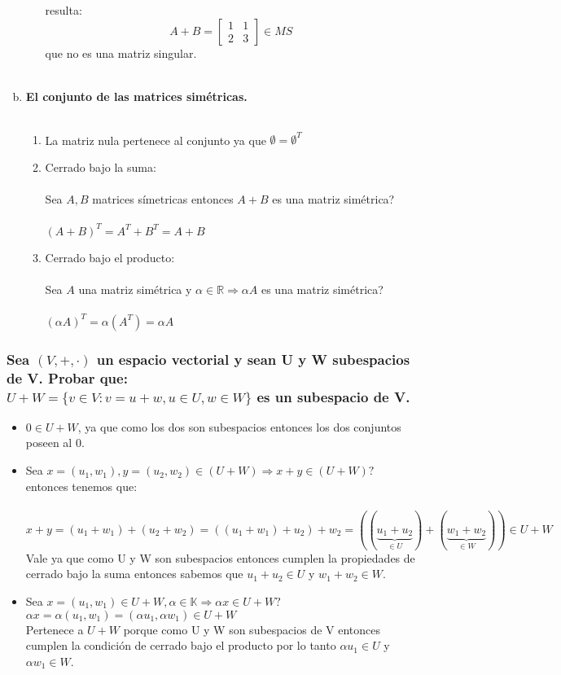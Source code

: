 \documentclass{article}
\begin{document}
\begin{enumerate}[a.]
\begin{enumerate}[(1)]
	resulta:
	\[
	A+B =
	\begin{bmatrix}
	1 & 1 \\
	2 & 3
	\end{bmatrix} \in MS
	\]
	que no es una matriz singular. \\ \\
\end{enumerate}

\item \textbf{El conjunto de las matrices simétricas. } \\ \\
\begin{enumerate}[(1)]
\item
	La matriz nula pertenece al conjunto ya que $\emptyset = \emptyset^T$
\item
	Cerrado bajo la suma: \\ \\
	Sea $A,B$ matrices símetricas entonces $A+B$ es una matriz simétrica? \\ \\
	$(A+B)^T = A^T + B^T = A + B$
\item
	Cerrado bajo el producto: \\ \\
	Sea $A$ una matriz simétrica y $\alpha \in \mathbb{R} \Rightarrow \alpha A$ es una matriz simétrica? \\ \\
	$(\alpha A)^T = \alpha (A^T) = \alpha A$  
\end{enumerate}
\end{enumerate}

\subsubsection{Sea $(V,+,\cdot)$ un espacio vectorial y sean U y W subespacios de V. Probar que: \\
$U+W = \lbrace v \in V : v = u+w, u \in U, w \in W \rbrace$ es un subespacio de V.}

\begin{itemize}
	\item
		$0 \in U+W$, ya que como los dos son subespacios entonces los dos conjuntos poseen al 0.
	\item
		Sea $x = {(u_1,w_1)},y = (u_2,w_2) \in (U+W) \Rightarrow x+y \in (U+W)?$ entonces tenemos que: \\ \\
		$x+y = (u_1+w_1) + (u_2+w_2) = ((u_1+w_1)+u_2)+w_2 = ((\underbrace{u_1+u_2}_{\in U})+(\underbrace{w_1+w_2}_{\in W})) \in U+W$\\
		Vale ya que como U y W son subespacios entonces cumplen la propiedades de cerrado bajo la suma entonces sabemos que $u_1+u_2 \in U$ y
		$w_1 + w_2 \in W$.
	\item
		Sea $x=(u_1,w_1) \in U+W, \alpha \in \mathbb{K} \Rightarrow \alpha x \in U+W?$ \\
		$\alpha x = \alpha (u_1,w_1) = (\alpha u_1,\alpha w_1) \in U+W$\\
		Pertenece a $U+W$ porque como U y W son subespacios de V entonces cumplen la condición de cerrado bajo el producto por lo tanto $\alpha u_1 \in U$ y 
		$\alpha w_1 \in W$.
\end{itemize}
\end{document}
